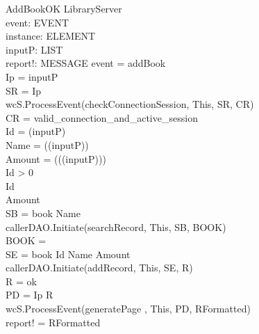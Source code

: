 \begin{schema}{AddBookOK}
\Delta LibraryServer \\
event: EVENT \\
instance: ELEMENT \\
inputP: LIST \\
report!: MESSAGE
\where event = addBook \\
Ip = \head inputP \\
SR = \lseq Ip \rseq \\ 
wcS.ProcessEvent(checkConnectionSession, This, SR, CR) \\
CR = valid\_connection\_and\_active\_session \\
Id = \head (\tail inputP) \\
Name = \head (\tail (\tail inputP)) \\
Amount = \head (\tail (\tail (\tail inputP))) \\
Id > 0 \\
Id  \\
Amount  \\
SB = \lseq book Name \rseq \\
callerDAO.Initiate(searchRecord, This, SB, BOOK) \\
BOOK = \emptyset \\
SE = \lseq book Id Name Amount \rseq \\
callerDAO.Initiate(addRecord, This, SE, R) \\
R = ok \\ 
PD = \lseq Ip R \rseq \\
wcS.ProcessEvent(generatePage , This, PD, RFormatted) \\
report! = RFormatted
\end{schema}

